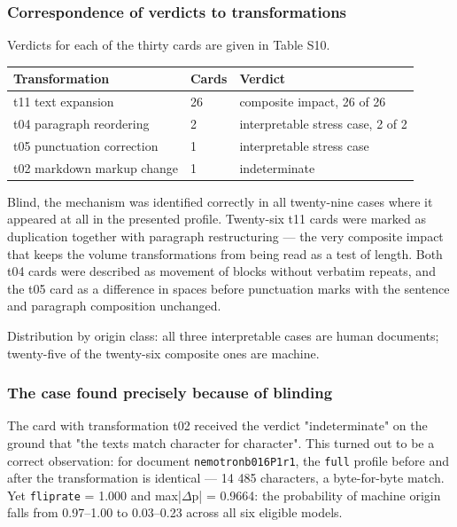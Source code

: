 \documentclass[11pt,a4paper]{article}
\renewcommand{\_}{\textunderscore\allowbreak}
\begin{document}
\subsubsection{Correspondence of verdicts to transformations}

Verdicts for each of the thirty cards are given in Table S10.

\begin{center}
\small
\begin{tabular}{lll}
\toprule
Transformation & Cards & Verdict \\
\midrule
t11 text expansion & 26 & composite impact, 26 of 26 \\
t04 paragraph reordering & 2 & interpretable stress case, 2 of 2 \\
t05 punctuation correction & 1 & interpretable stress case \\
t02 markdown markup change & 1 & indeterminate \\
\bottomrule
\end{tabular}
\end{center}

Blind, the mechanism was identified correctly in all twenty-nine cases where it
appeared at all in the presented profile. Twenty-six t11 cards were marked as
duplication together with paragraph restructuring — the very composite impact
that keeps the volume transformations from being read as a test of length. Both t04
cards were described as movement of blocks without verbatim repeats, and the t05 card
as a difference in spaces before punctuation marks with the sentence and paragraph
composition unchanged.

Distribution by origin class: all three interpretable cases are human documents;
twenty-five of the twenty-six composite ones are machine.

\subsubsection{The case found precisely because of blinding}

The card with transformation t02 received the verdict "indeterminate" on the ground
that "the texts match character for character". This turned out to be a correct
observation: for document \texttt{nemotron\_b016\_P1\_r1}, the \texttt{full} profile before and after
the transformation is identical — 14 485 characters, a byte-for-byte match. Yet
\texttt{flip\_rate} = 1.000 and max|$\Delta$p| = 0.9664: the probability of machine origin falls
from 0.97–1.00 to 0.03–0.23 across all six eligible models.
\end{document}
